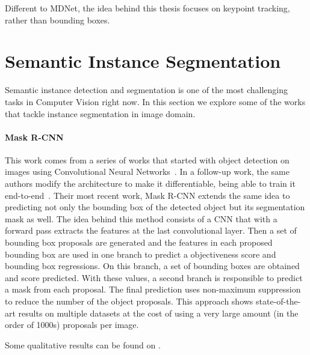 Different to MDNet, the idea behind this thesis focuses on keypoint tracking, rather than bounding boxes.



\section{Semantic Instance Segmentation}
\label{sec:stateofart:semanticinstancesegmentation}

Semantic instance detection and segmentation is one of the most challenging tasks in Computer Vision right now.
In this section we explore some of the works that tackle instance segmentation in image domain.


\paragraph{Mask R-CNN~\maskrcnn{}}
This work comes from a series of works that started with object detection on images using Convolutional Neural Networks~\fastrcnn{}.
In a follow-up work, the same authors modify the architecture to make it differentiable, being able to train it end-to-end~\fasterrcnn{}.
Their most recent work, Mask R-CNN extends the same idea to predicting not only the bounding box of the detected object but its segmentation mask as well.
The idea behind this method consists of a CNN that with a forward pass extracts the features at the last convolutional layer.
Then a set of bounding box proposals are generated and the features in each proposed bounding box are used in one branch to predict a objectiveness score and bounding box regressions.
On this branch, a set of bounding boxes are obtained and score predicted. With these values, a second branch is responsible to predict a mask from each proposal.
The final prediction uses non-maximum suppression to reduce the number of the object proposals.
This approach shows state-of-the-art results on multiple datasets at the cost of using a very large amount (in the order of 1000s) proposals per image.

Some qualitative results can be found on .

